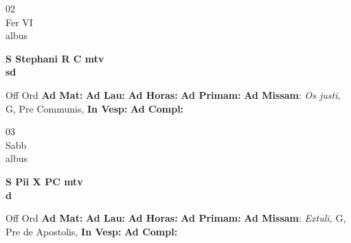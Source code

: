 \documentclass[10pt, openany]{book}
\begin{document}
        \begin{center}
            \begin{minipage}{3.5in}
                \vspace{2em}
                \begin{minipage}{0.5in}
                    {\Huge 02} \\
                    {\normalsize Fer VI} \\
                    {\normalsize albus}
                \end{minipage}
                \begin{minipage}{3.0in}
                    \textbf{ \large S Stephani R C mtv \\
                    \textnormal{\normalsize sd}} \\ 
                \end{minipage}
                \begin{justify}Off Ord
                    \textbf{Ad Mat: }
                    \textbf{Ad Lau: }
                    \textbf{Ad Horas: }
                    \textbf{Ad Primam: }\textbf{Ad Missam}: \textit{Os justi,} G, Pre Communis,  
                    \textbf{In Vesp: }
                    \textbf{Ad Compl: }
                \end{justify}
            \end{minipage}
        \end{center}
    
        \begin{center}
            \begin{minipage}{3.5in}
                \vspace{2em}
                \begin{minipage}{0.5in}
                    {\Huge 03} \\
                    {\normalsize Sabb} \\
                    {\normalsize albus}
                \end{minipage}
                \begin{minipage}{3.0in}
                    \textbf{ \large S Pii X PC mtv \\
                    \textnormal{\normalsize d}} \\ 
                \end{minipage}
                \begin{justify}Off Ord
                    \textbf{Ad Mat: }
                    \textbf{Ad Lau: }
                    \textbf{Ad Horas: }
                    \textbf{Ad Primam: }\textbf{Ad Missam}: \textit{Extuli,} G, Pre de Apostolis,  
                    \textbf{In Vesp: }
                    \textbf{Ad Compl: }
                \end{justify}
            \end{minipage}
        \end{center}
    
\end{document}
